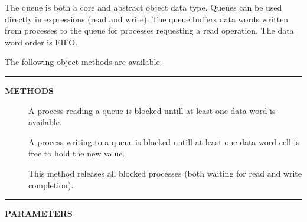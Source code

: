 \documentclass[a4paper,12pt,twoside,english]{article}
\begin{document}
\def\thesubsubsection{\tocXLVIII}
\secIII{\label{toclabelXLVIII}\thesubsubsection}
The queue is both a core and abstract object data type. Queues can be used directly in
expressions (read and write). The queue buffers data words written from processes to the queue for processes requesting a read operation. The data word order is
FIFO.   


\vskip5pt
The following object methods are available:


\vskip5pt
\vskip5pt\color{highlight-color}
{\rule[-1pt]{2em}{1em}\hskip15pt\bf METHODS

}
\color{black}

\begin{description}
\item[] $ $\\
A process reading a queue is blocked untill at least one data word is available.

\item[] $ $\\
A process writing to a queue is blocked untill at least one data word cell is free to hold the new value.

\item[] $ $\\
This method releases all blocked processes (both waiting for read and write completion). 


\end{description}
\vskip5pt\color{highlight-color}
{\rule[-1pt]{2em}{1em}\hskip15pt\bf PARAMETERS

}
\color{black}
\end{document}
